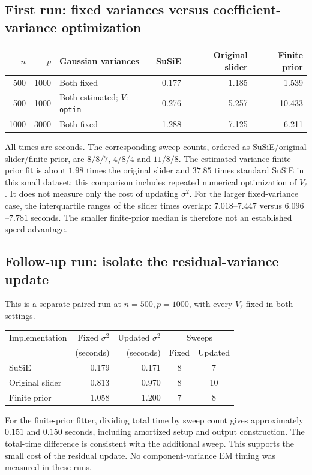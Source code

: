 \documentclass[11pt]{article}
\begin{document}
\subsection{First run: fixed variances versus coefficient-variance optimization}
\begin{center}
\small
\begin{tabular}{@{}rrlrrr@{}}
\toprule
$n$ & $p$ & Gaussian variances & SuSiE & Original slider & Finite prior\\
\midrule
500 & 1000 & Both fixed & 0.177 & 1.185 & 1.539\\
500 & 1000 & Both estimated; $V$: \texttt{optim} & 0.276 & 5.257 & 10.433\\
1000 & 3000 & Both fixed & 1.288 & 7.125 & 6.211\\
\bottomrule
\end{tabular}
\end{center}
All times are seconds. The corresponding sweep counts, ordered as
SuSiE/original slider/finite prior, are $8/8/7$, $4/8/4$ and $11/8/8$.
The estimated-variance finite-prior fit is about $1.98$ times the original
slider and $37.85$ times standard SuSiE in this small dataset; this
comparison includes repeated numerical optimization of $V_\ell$.
It does not measure only the cost of updating $\sigma^2$.
For the larger fixed-variance case, the interquartile ranges of the
slider times overlap: $7.018$--$7.447$ versus $6.096$--$7.781$ seconds.
The smaller finite-prior median is therefore not an established speed
advantage.

\subsection{Follow-up run: isolate the residual-variance update}
This is a separate paired run at $n=500,p=1000$, with every $V_\ell$
fixed in both settings.
\begin{center}
\small
\begin{tabular}{@{}lrrcc@{}}
\toprule
Implementation & Fixed $\sigma^2$ & Updated $\sigma^2$ &
 \multicolumn{2}{c}{Sweeps}\\
 & (seconds) & (seconds) & Fixed & Updated\\
\midrule
SuSiE & 0.179 & 0.171 & 8 & 7\\
Original slider & 0.813 & 0.970 & 8 & 10\\
Finite prior & 1.058 & 1.200 & 7 & 8\\
\bottomrule
\end{tabular}
\end{center}
For the finite-prior fitter, dividing total time by sweep count gives
approximately $0.151$ and $0.150$ seconds, including amortized setup and
output construction. The total-time difference is consistent with the
additional sweep. This supports the small cost of the residual update.
No component-variance EM timing was measured in these runs.
\end{document}
